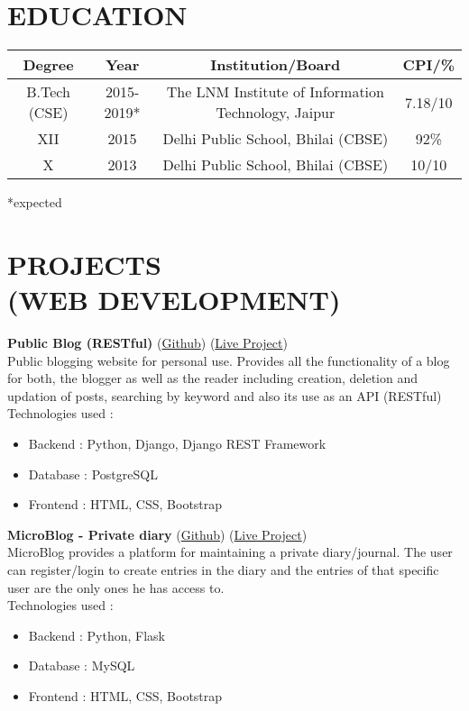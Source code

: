 \documentclass[margin]{res}
\begin{document}
\begin{resume}

\section{EDUCATION}

\begin{tabular}{|c|c|c|c|}

\hline
\textbf{Degree} & \textbf{Year} & {Institution/Board} & {CPI/\%} \\
\hline
B.Tech (CSE) & 2015-2019* & The LNM Institute of Information Technology, Jaipur & 7.18/10 \\
\hline
XII & 2015 & Delhi Public School, Bhilai (CBSE) & 92\% \\
\hline
X & 2013 & Delhi Public School, Bhilai (CBSE) & 10/10 \\
\hline
\end{tabular}
*expected

\section{PROJECTS\\(WEB DEVELOPMENT)}
  {\textbf{Public Blog (RESTful)}} (\href{https://github.com/gauravkulkarni96/blog}{Github}) (\href{https://gauravkulkarni.herokuapp.com/blog}{Live Project})\\
  Public blogging website for personal use. Provides all the functionality of a blog for both, the blogger as well as the reader including creation, deletion and updation of posts, searching by keyword and also its use as an API (RESTful)\\
Technologies used :
   \begin{itemize}  \itemsep -2pt %
   \item Backend : Python, Django, Django REST Framework
   \item Database : PostgreSQL
   \item Frontend : HTML, CSS, Bootstrap
   \end{itemize}

   {\textbf{MicroBlog - Private diary}} (\href{https://github.com/gauravkulkarni96/MicroBlog}{Github}) (\href{https://microblog96.herokuapp.com}{Live Project})\\
    MicroBlog provides a platform for maintaining a private diary/journal. The user can register/login to create entries in the diary and the entries of that specific user are the only ones he has access to.\\
Technologies used :
    \begin{itemize} \itemsep -2pt
     \item Backend : Python, Flask
     \item Database : MySQL
     \item Frontend : HTML, CSS, Bootstrap
     \end{itemize}


\end{resume}
\end{document}
